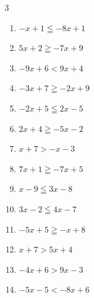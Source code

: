 \begin{multicols}{3}
\begin{enumerate}
  \item $-x+1\leqq -8x+1$

        \phantom{$\displaystyle x\leqq 0$}

  \item $5x+2\geqq -7x+9$


  \item $-9x+6<9x+4$


  \item $-3x+7\geqq -2x+9$

        \phantom{$\displaystyle x\leqq -2$}

  \item $-2x+5\leqq 2x-5$


  \item $2x+4\geqq -5x-2$


  \item $x+7>-x-3$

        \phantom{$\displaystyle x>-5$}

  \item $7x+1\geqq -7x+5$


  \item $x-9\leqq 3x-8$


  \item $3x-2\leqq 4x-7$

        \phantom{$\displaystyle x\geqq 5$}

  \item $-5x+5\geqq -x+8$


  \item $x+7>5x+4$


  \item $-4x+6>9x-3$


  \item $-5x-5<-8x+6$


\end{enumerate}
\end{multicols}
